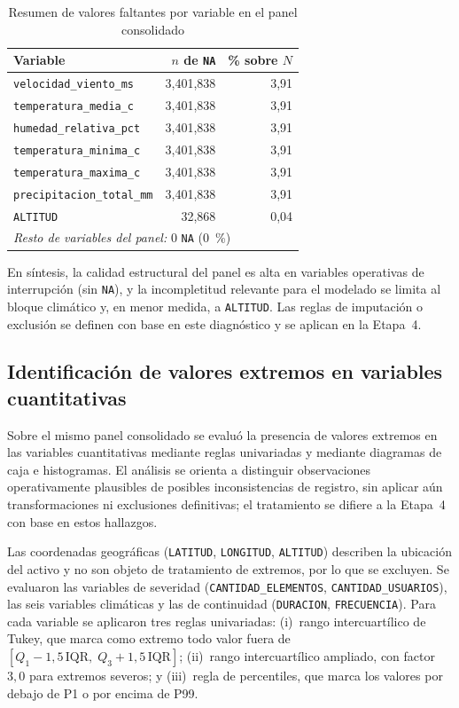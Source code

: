 \begin{table}[H]
\centering
\small
\caption{Resumen de valores faltantes por variable en el panel consolidado}
\label{tab:resumen_datos_faltantes}
\begin{tabular}{l r r}
\toprule
\textbf{Variable} & \textbf{$n$ de \texttt{NA}} & \textbf{\% sobre $N$} \\
\midrule
\texttt{velocidad\_viento\_ms} & 3{,}401{,}838 & 3,91 \\
\texttt{temperatura\_media\_c} & 3{,}401{,}838 & 3,91 \\
\texttt{humedad\_relativa\_pct} & 3{,}401{,}838 & 3,91 \\
\texttt{temperatura\_minima\_c} & 3{,}401{,}838 & 3,91 \\
\texttt{temperatura\_maxima\_c} & 3{,}401{,}838 & 3,91 \\
\texttt{precipitacion\_total\_mm} & 3{,}401{,}838 & 3,91 \\
\texttt{ALTITUD} & 32{,}868 & 0,04 \\
\midrule
\multicolumn{3}{l}{\textit{Resto de variables del panel:} $0$ \texttt{NA} ($0$~\%)} \\
\bottomrule
\end{tabular}
\end{table}

\noindent En síntesis, la calidad estructural del panel es alta en variables operativas de interrupción (sin \texttt{NA}), y la incompletitud relevante para el modelado se limita al bloque climático y, en menor medida, a \texttt{ALTITUD}. Las reglas de imputación o exclusión se definen con base en este diagnóstico y se aplican en la Etapa~4.

\subsection{Identificación de valores extremos en variables cuantitativas}

\label{sec:identificacion_valores_extremos}

Sobre el mismo panel consolidado se evaluó la presencia de valores extremos en las variables cuantitativas mediante reglas univariadas y mediante diagramas de caja e histogramas. El análisis se orienta a distinguir observaciones operativamente plausibles de posibles inconsistencias de registro, sin aplicar aún transformaciones ni exclusiones definitivas; el tratamiento se difiere a la Etapa~4 con base en estos hallazgos.

Las coordenadas geográficas (\texttt{LATITUD}, \texttt{LONGITUD}, \texttt{ALTITUD}) describen la ubicación del activo y no son objeto de tratamiento de extremos, por lo que se excluyen. Se evaluaron las variables de severidad (\texttt{CANTIDAD\_ELEMENTOS}, \texttt{CANTIDAD\_USUARIOS}), las seis variables climáticas y las de continuidad (\texttt{DURACION}, \texttt{FRECUENCIA}). Para cada variable se aplicaron tres reglas univariadas: (i)~rango intercuartílico de Tukey, que marca como extremo todo valor fuera de $[Q_1 - 1{,}5\,\mathrm{IQR},\; Q_3 + 1{,}5\,\mathrm{IQR}]$; (ii)~rango intercuartílico ampliado, con factor $3{,}0$ para extremos severos; y (iii)~regla de percentiles, que marca los valores por debajo de P1 o por encima de P99.

